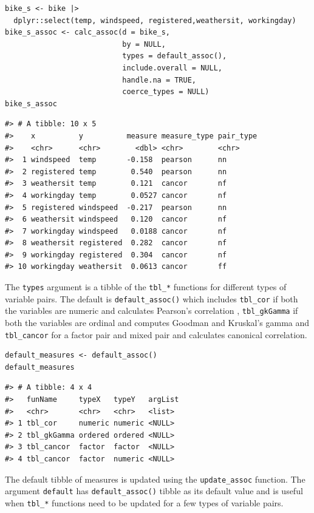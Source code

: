 \begin{verbatim}
bike_s <- bike |> 
  dplyr::select(temp, windspeed, registered,weathersit, workingday)
bike_s_assoc <- calc_assoc(d = bike_s,
                           by = NULL,
                           types = default_assoc(),
                           include.overall = NULL,
                           handle.na = TRUE,
                           coerce_types = NULL)
bike_s_assoc
\end{verbatim}

\begin{verbatim}
#> # A tibble: 10 x 5
#>    x          y          measure measure_type pair_type
#>    <chr>      <chr>        <dbl> <chr>        <chr>    
#>  1 windspeed  temp       -0.158  pearson      nn       
#>  2 registered temp        0.540  pearson      nn       
#>  3 weathersit temp        0.121  cancor       nf       
#>  4 workingday temp        0.0527 cancor       nf       
#>  5 registered windspeed  -0.217  pearson      nn       
#>  6 weathersit windspeed   0.120  cancor       nf       
#>  7 workingday windspeed   0.0188 cancor       nf       
#>  8 weathersit registered  0.282  cancor       nf       
#>  9 workingday registered  0.304  cancor       nf       
#> 10 workingday weathersit  0.0613 cancor       ff
\end{verbatim}

The \texttt{types} argument is a tibble of the \texttt{tbl\_*} functions for different types of variable pairs. The default is \texttt{default\_assoc()} which includes \texttt{tbl\_cor} if both the variables are numeric and calculates Pearson's correlation , \texttt{tbl\_gkGamma} if both the variables are ordinal and computes Goodman and Kruskal's gamma and \texttt{tbl\_cancor} for a factor pair and mixed pair and calculates canonical correlation.

\begin{verbatim}
default_measures <- default_assoc()
default_measures
\end{verbatim}

\begin{verbatim}
#> # A tibble: 4 x 4
#>   funName     typeX   typeY   argList
#>   <chr>       <chr>   <chr>   <list> 
#> 1 tbl_cor     numeric numeric <NULL> 
#> 2 tbl_gkGamma ordered ordered <NULL> 
#> 3 tbl_cancor  factor  factor  <NULL> 
#> 4 tbl_cancor  factor  numeric <NULL>
\end{verbatim}

The default tibble of measures is updated using the \texttt{update\_assoc} function. The argument \texttt{default} has \texttt{default\_assoc()} tibble as its default value and is useful when \texttt{tbl\_*} functions need to be updated for a few types of variable pairs.

